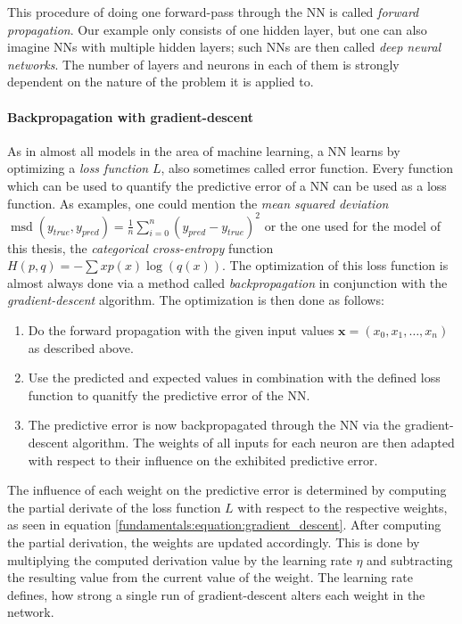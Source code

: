 This procedure of doing one forward-pass through the NN is called \emph{forward propagation}. Our example only consists of one hidden layer, but one can also imagine NNs with multiple hidden layers; such NNs are then called \emph{deep neural networks}. The number of layers and neurons in each of them is strongly dependent on the nature of the problem it is applied to.

\paragraph{Backpropagation with gradient-descent} As in almost all models in the area of machine learning, a NN learns by optimizing a \emph{loss function} $L$, also sometimes called error function. Every function which can be used to quantify the predictive error of a NN can be used as a loss function. As examples, one could mention the \emph{mean squared deviation} $\operatorname{msd}(y_{true}, y_{pred}) = \frac{1}{n}\sum_{i=0}^{n} (y_{pred} - y_{true})^2$ or the one used for the model of this thesis, the \emph{categorical cross-entropy} function $H(p,q) = -\sum{x} p(x)\operatorname{log}(q(x))$. The optimization of this loss function is almost always done via a method called \emph{backpropagation} in conjunction with the \emph{gradient-descent} algorithm. The optimization is then done as follows:

\begin{enumerate}
	\item Do the forward propagation with the given input values $\mathbf{x} = (x_0, x_1, \dots, x_n)$ as described above.
	\item Use the predicted and expected values in combination with the defined loss function to quanitfy the predictive error of the NN.
	\item The predictive error is now backpropagated through the NN via the gradient-descent algorithm. The weights of all inputs for each neuron are then adapted with respect to their influence on the exhibited predictive error.
\end{enumerate}

The influence of each weight on the predictive error is determined by computing the partial derivate of the loss function $L$ with respect to the respective weights, as seen in equation \ref{fundamentals:equation:gradient_descent}. After computing the partial derivation, the weights are updated accordingly. This is done by multiplying the computed derivation value by the learning rate $\eta$ and subtracting the resulting value from the current value of the weight. The learning rate defines, how strong a single run of gradient-descent alters each weight in the network.

